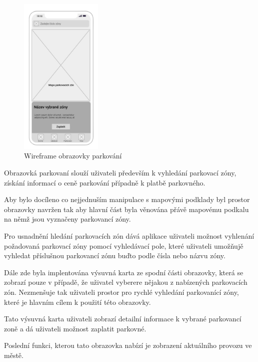 \begin{figure}
  \centering
  \includegraphics[width=0.35\textwidth]{parking_wireframe.png} 
  \caption{Wireframe obrazovky parkování}
\end{figure}

Obrazovká parkovaní slouží uživateli především k vyhledání parkovací zóny, získání informací o ceně parkování případně k platbě parkovného.

Aby bylo docíleno co nejjednuším manipulace s mapovými podklady byl prostor obrazovky navržen tak aby hlavní část byla věnována přávě mapovému
podkalu na němž jsou vyznačeny parkovancí zóny. 

Pro usnadnění hledání parkovacích zón dává aplikace uživateli možnost vyhlenání požadovaná parkovací zóny pomocí vyhledávací pole, které 
uživateli umožňujě vyhledat příslušnou parkovancí zónu buďto podle čísla nebo názvu zóny. 

Dále zde byla implentována výsuvná karta ze spodní části obrazovky, která se zobrazí pouze v případě, že uživatel vyberere nějakou
z nabízených parkovacích zón. Nezmenšuje tak uživateli prostor pro rychlé vyhledání parkovanící zóny, které je hlavním cílem k použití této obrazovky. 

Tato výsuvná karta uživateli zobrazí detailní informace k vybrané parkovancí zoně a dá uživateli možnost zaplatit parkovné.

Poslední funkci, kterou tato obrazovka nabízí je zobrazení aktuálního provozu ve městě. 



